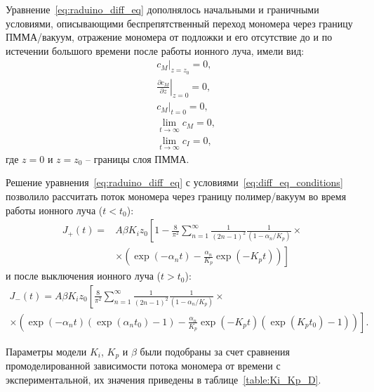 Уравнение~\ref{eq:raduino_diff_eq} дополнялось начальными и граничными условиями, описывающими беспрепятственный переход мономера через границу ПММА/вакуум, отражение мономера от подложки и его отсутствие до и по истечении большого времени после работы ионного луча, имели вид:
\begin{equation} \label{eq:diff_eq_conditions}
	\begin{aligned}
		&\left.c_M\right|_{z=z_0}=0, \\
		&\left.\frac{\partial c_M}{\partial z}\right|_{z=0}=0, \\
		&\left.c_M\right|_{t=0}=0, \\
		&\lim _{t \rightarrow \infty} c_M=0, \\
		&\lim _{t \rightarrow \infty} c_I=0,
	\end{aligned}
\end{equation}
где $z = 0$ и $z = z_0$ -- границы слоя ПММА.

Решение уравнения~\ref{eq:raduino_diff_eq} с условиями~\ref{eq:diff_eq_conditions} позволило рассчитать поток мономера через границу полимер/вакуум во время работы ионного луча ($t < t_0$):
\begin{equation}
	\begin{aligned}
		J_{+}(t)= & A \beta K_i z_0
		\left[
		1-\frac{8}{\pi^2} \sum_{n=1}^{\infty}
		\frac{1}{(2n-1)^2} \frac{1}{(1-\alpha_n / K_p)} \times \right. \\ & \left.
		\times
		\left(
			\exp (-\alpha_n t)-\frac{\alpha_n}{K_p} \exp (-K_p t)
		\right)
		\right]
	\end{aligned}
\end{equation}
и после выключения ионного луча ($t > t_0$):
\begin{equation}
	\begin{aligned}
		J_{-}(t)= A \beta K_i z_0 \left[
			\frac{8}{\pi^2} \sum_{n=1}^{\infty} \frac{1}{(2 n-1)^2} \frac{1}{\left(1-\alpha_n / K_p\right)}\right. \times \quad \quad \quad \quad \\
	\times \left.
	\left(
	\exp (-\alpha_n t) (\exp (\alpha_n t_0)-1)- \frac{\alpha_n}{K_p}
	\exp (-K_p t) (\exp (K_p t_0)-1)
	\right)
	\right].
	\end{aligned}
\end{equation}

Параметры модели $K_i$, $K_p$ и $\beta$ были подобраны за счет сравнения промоделированной зависимости потока мономера от времени с экспериментальной, их значения приведены в таблице~\ref{table:Ki_Kp_D}.

